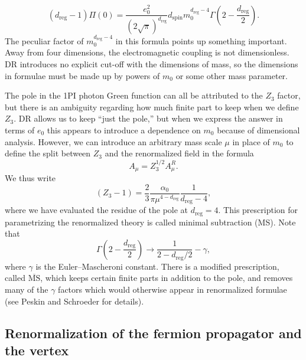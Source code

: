 \[
  (d_{\mathrm{reg}}-1)\Pi(0)=\frac{e_0^2}{(2\sqrt\pi)^{d_{\mathrm{reg}}}}
  d_{\mathrm{spin}}m_0^{d_{\mathrm{reg}}-4}\Gamma\!\left(2-\frac{d_{\mathrm{reg}}}{2}\right).
\]
The peculiar factor of $m_0^{d_{\mathrm{reg}}-4}$ in this formula points up something
important. Away from four dimensions, the electromagnetic coupling is not
dimensionless. DR introduces no explicit cut-off with the dimensions of mass,
so the dimensions in formulae must be made up by powers of $m_0$ or some other
mass parameter.

The pole in the 1PI photon Green function can all be attributed to the $Z_3$
factor, but there is an ambiguity regarding how much finite part to keep when
we define $Z_3$. DR allows us to keep ``just the pole,'' but when we express
the answer in terms of $e_0$ this appears to introduce a dependence on $m_0$
because of dimensional analysis. However, we can introduce an arbitrary mass
scale $\mu$ in place of $m_0$ to define the split between $Z_3$ and the
renormalized field in the formula
\[
  A_\mu=Z_3^{1/2}A_\mu^R.
\]
We thus write
\[
  (Z_3-1)=\frac{2}{3}\frac{\alpha_0}{\pi\mu^{4-d_{\mathrm{reg}}}}
  \frac{1}{d_{\mathrm{reg}}-4},
\]
where we have evaluated the residue of the pole at $d_{\mathrm{reg}}=4$. This prescription
for parametrizing the renormalized theory is called minimal subtraction (MS).
Note that
\[
  \Gamma\!\left(2-\frac{d_{\mathrm{reg}}}{2}\right)
  \longrightarrow\frac{1}{2-d_{\mathrm{reg}}/2}-\gamma,
\]
where $\gamma$ is the Euler--Mascheroni constant. There is a modified
prescription, called $\overline{\mathrm{MS}}$, which keeps certain finite parts
in addition to the pole, and removes many of the $\gamma$ factors which would
otherwise appear in renormalized formulae (see Peskin and Schroeder
\cite{banks-ref-33} for details).

\subsection{Renormalization of the fermion propagator and the vertex}

